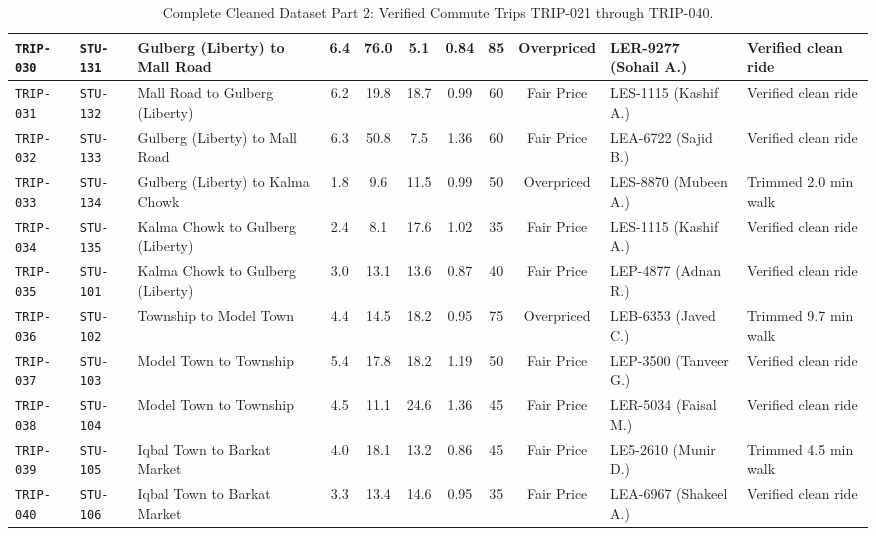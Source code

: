 \documentclass[10pt, a4paper]{article}
\begin{document}
\begin{table}[h!]
\begin{tabularx}{\textwidth}{|l|l|l|c|c|c|c|c|c|p{2.4cm}|X|}
\rowcolor{lightgray}\texttt{TRIP-030} & \texttt{STU-131} & Gulberg (Liberty) to Mall Road & 6.4 & 76.0 & 5.1 & 0.84 & 85 & Overpriced & LER-9277 (Sohail A.) & Verified clean ride \\ \hline
\rowcolor{white}\texttt{TRIP-031} & \texttt{STU-132} & Mall Road to Gulberg (Liberty) & 6.2 & 19.8 & 18.7 & 0.99 & 60 & Fair Price & LES-1115 (Kashif A.) & Verified clean ride \\ \hline
\rowcolor{lightgray}\texttt{TRIP-032} & \texttt{STU-133} & Gulberg (Liberty) to Mall Road & 6.3 & 50.8 & 7.5 & 1.36 & 60 & Fair Price & LEA-6722 (Sajid B.) & Verified clean ride \\ \hline
\rowcolor{white}\texttt{TRIP-033} & \texttt{STU-134} & Gulberg (Liberty) to Kalma Chowk & 1.8 & 9.6 & 11.5 & 0.99 & 50 & Overpriced & LES-8870 (Mubeen A.) & Trimmed 2.0 min walk \\ \hline
\rowcolor{lightgray}\texttt{TRIP-034} & \texttt{STU-135} & Kalma Chowk to Gulberg (Liberty) & 2.4 & 8.1 & 17.6 & 1.02 & 35 & Fair Price & LES-1115 (Kashif A.) & Verified clean ride \\ \hline
\rowcolor{white}\texttt{TRIP-035} & \texttt{STU-101} & Kalma Chowk to Gulberg (Liberty) & 3.0 & 13.1 & 13.6 & 0.87 & 40 & Fair Price & LEP-4877 (Adnan R.) & Verified clean ride \\ \hline
\rowcolor{lightgray}\texttt{TRIP-036} & \texttt{STU-102} & Township to Model Town & 4.4 & 14.5 & 18.2 & 0.95 & 75 & Overpriced & LEB-6353 (Javed C.) & Trimmed 9.7 min walk \\ \hline
\rowcolor{white}\texttt{TRIP-037} & \texttt{STU-103} & Model Town to Township & 5.4 & 17.8 & 18.2 & 1.19 & 50 & Fair Price & LEP-3500 (Tanveer G.) & Verified clean ride \\ \hline
\rowcolor{lightgray}\texttt{TRIP-038} & \texttt{STU-104} & Model Town to Township & 4.5 & 11.1 & 24.6 & 1.36 & 45 & Fair Price & LER-5034 (Faisal M.) & Verified clean ride \\ \hline
\rowcolor{white}\texttt{TRIP-039} & \texttt{STU-105} & Iqbal Town to Barkat Market & 4.0 & 18.1 & 13.2 & 0.86 & 45 & Fair Price & LE5-2610 (Munir D.) & Trimmed 4.5 min walk \\ \hline
\rowcolor{lightgray}\texttt{TRIP-040} & \texttt{STU-106} & Iqbal Town to Barkat Market & 3.3 & 13.4 & 14.6 & 0.95 & 35 & Fair Price & LEA-6967 (Shakeel A.) & Verified clean ride \\ \hline
\end{tabularx}
\caption{\small Complete Cleaned Dataset Part 2: Verified Commute Trips TRIP-021 through TRIP-040.}
\end{table}
\end{document}
